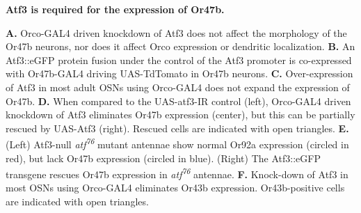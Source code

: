 {\bf Atf3 is required for the expression of Or47b.}

\textbf{A.} Orco-GAL4 driven knockdown of Atf3 does not affect the morphology of the Or47b neurons, nor does it affect Orco expression or dendritic localization.
\textbf{B.} An Atf3::eGFP protein fusion under the control of the Atf3 promoter is co-expressed with Or47b-GAL4 driving UAS-TdTomato in Or47b neurons.
\textbf{C.} Over-expression of Atf3 in most adult OSNs using Orco-GAL4 does not expand the expression of Or47b.
\textbf{D.} When compared to the UAS-atf3-IR control (left), Orco-GAL4 driven knockdown of Atf3 eliminates Or47b expression (center), but this can be partially rescued by UAS-Atf3 (right). Rescued cells are indicated with open triangles.
\textbf{E.} (Left) Atf3-null \emph{atf\textsuperscript{76}} mutant antennae show normal Or92a expression (circled in red), but lack Or47b expression (circled in blue). (Right) The Atf3::eGFP transgene rescues Or47b expression in \emph{atf\textsuperscript{76}} antennae.
\textbf{F.} Knock-down of Atf3 in most OSNs using Orco-GAL4 eliminates Or43b expression. Or43b-positive cells are indicated with open triangles.
\label{fig:3}
